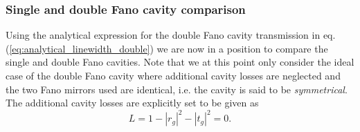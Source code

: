 \subsubsection{Single and double Fano cavity comparison}\label{sec:single_vs_double_comparison_theory}

Using the analytical expression for the double Fano cavity transmission in eq. (\ref{eq:analytical_linewidth_double}) we are now in a position to compare the single and double Fano cavities. Note that we at this point only consider the ideal case of the double Fano cavity where additional cavity losses are neglected and the two Fano mirrors used are identical, i.e. the cavity is said to be \emph{symmetrical}. The additional cavity losses are explicitly set to be given as
\begin{equation}
    L = 1-|r_g|^2-|t_g|^2 = 0.
\end{equation}

